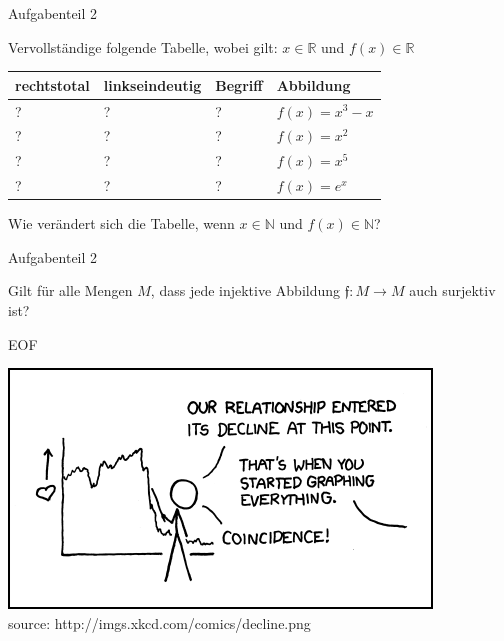 \documentclass[18pt]{beamer}
\begin{document}
	\begin{frame}{Aufgabenteil 2}

		Vervollst\"andige folgende Tabelle, wobei gilt:
		$x \in \mathbb{R}$ und $f(x) \in \mathbb{R}$\\

		\begin{block}{}
			\begin{tabular}{llll}
				\hline
				\textbf{rechtstotal} & \textbf{linkseindeutig} & \textbf{Begriff} & \textbf{Abbildung} \\
				\hline
				? & ? & ? & $f(x) = x^3-x$\\
				? & ? & ? & $f(x) = x^2$\\
				? & ? & ? & $f(x) = x^5$\\
				? & ? & ? & $f(x) = e^{x}$\\
				\hline
			\end{tabular}
		\end{block}

		\pause
		Wie ver\"andert sich die Tabelle, wenn $x \in \mathbb{N}$ und $f(x) \in \mathbb{N}$?
	\end{frame}



	\begin{frame}{Aufgabenteil 2}

		\begin{block}{}
			Gilt f\"ur alle Mengen $M$, dass jede injektive Abbildung $\mathfrak{f} : M \rightarrow M$ auch surjektiv ist?
		\end{block}

	\end{frame}
	


	\begin{frame} {EOF}
		\begin{center}
			\includegraphics[scale=0.5]{graphics/01/eof1.png}\\
			\tiny source: http://imgs.xkcd.com/comics/decline.png
		\end{center}
	\end{frame}
\end{document}
